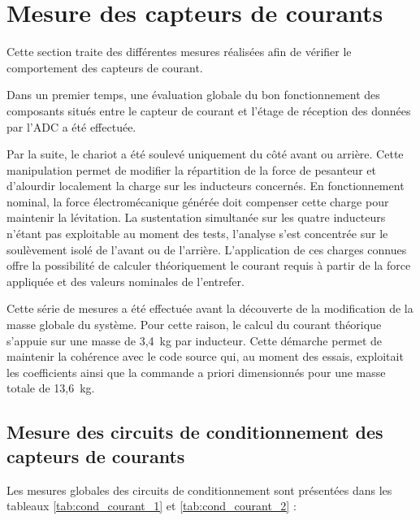 \section{Mesure des capteurs de courants}
Cette section traite des différentes mesures réalisées afin de vérifier le comportement des capteurs de courant.

Dans un premier temps, une évaluation globale du bon fonctionnement des composants situés entre le capteur de courant et l'étage de réception des données par l'ADC a été effectuée.

Par la suite, le chariot a été soulevé uniquement du côté avant ou arrière. Cette manipulation permet de modifier la répartition de la force de pesanteur et d'alourdir localement la charge sur les inducteurs concernés. En fonctionnement nominal, la force électromécanique générée doit compenser cette charge pour maintenir la lévitation. La sustentation simultanée sur les quatre inducteurs n'étant pas exploitable au moment des tests, l'analyse s'est concentrée sur le soulèvement isolé de l'avant ou de l'arrière. L'application de ces charges connues offre la possibilité de calculer théoriquement le courant requis à partir de la force appliquée et des valeurs nominales de l'entrefer.

Cette série de mesures a été effectuée avant la découverte de la modification de la masse globale du système. Pour cette raison, le calcul du courant théorique s'appuie sur une masse de 3,4~kg par inducteur. Cette démarche permet de maintenir la cohérence avec le code source qui, au moment des essais, exploitait les coefficients ainsi que la commande a priori dimensionnés pour une masse totale de 13,6~kg.

\subsection{Mesure des circuits de conditionnement des capteurs de courants}

Les mesures globales des circuits de conditionnement sont présentées dans les tableaux \ref{tab:cond_courant_1} et \ref{tab:cond_courant_2} :


